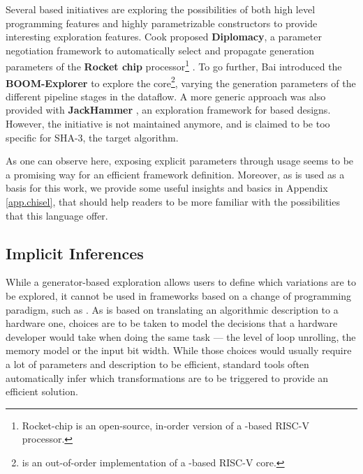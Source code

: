         Several \chisel{} based initiatives are exploring the possibilities of both high level programming features and highly parametrizable constructors to provide interesting exploration features.
        Cook \etal{} \cite{cook_diplomatic_2017} proposed {\bf Diplomacy}, a parameter negotiation framework to automatically select and propagate generation parameters of the {\bf Rocket chip} processor\footnote{Rocket-chip is an open-source, in-order version of a \chisel{}-based RISC-V processor.} \cite{asanovic_rocket_2016}. 
        To go further, Bai \etal{} introduced the {\bf BOOM-Explorer} \cite{bai_boom-explorer_2021} to explore the  core\footnote{ is an out-of-order implementation of a \chisel{}-based RISC-V core.}, varying the generation parameters of the different pipeline stages in the dataflow.
        A more generic approach was also provided with {\bf JackHammer} \cite{schmidt_fast_2015}, an exploration framework for \chisel{} based designs.
        However, the initiative is not maintained anymore, and is claimed to be too specific for SHA-3, the target algorithm.

        As one can observe here, exposing explicit parameters through  usage seems to be a promising way for an efficient  framework definition. 
        Moreover, as \chisel{} is used as a basis for this work, we provide some useful insights and basics in Appendix \ref{app.chisel}, that should help readers to be more familiar with the possibilities that this language offer.

    \subsection{Implicit Inferences}
    \label{ch.state:sec.space:ssec.implicit}

        While a generator-based exploration allows users to define which variations are to be explored, it cannot be used in frameworks based on a change of programming paradigm, such as .
        As  is based on translating an algorithmic description to a hardware one, choices are to be taken to model the decisions that a hardware developer would take when doing the same task --- \eg the level of loop unrolling, the memory model or the input bit width.
        While those choices would usually require a lot of parameters and description to be efficient, standard  tools often automatically infer which transformations are to be triggered to provide an efficient solution.

